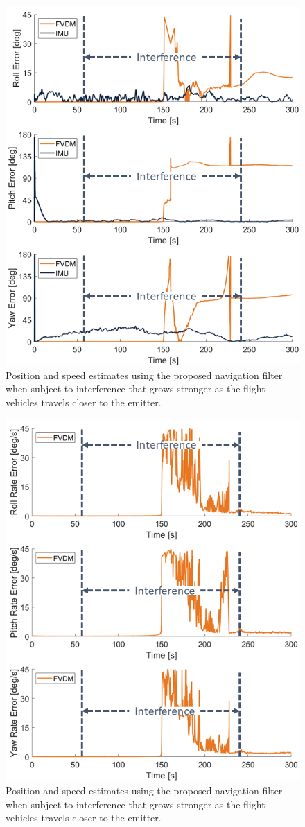\begin{figure}[!ht]
    \centering
    \includegraphics[width=0.75\linewidth]{Figures/Results/trajectoryfigure/Slide7.PNG}
    \caption{Position and speed estimates using the proposed navigation filter when subject to interference that grows stronger as the flight vehicles travels closer to the emitter.}\label{fig:EulScene2}
\end{figure}


\begin{figure}[!ht]
    \centering
    \includegraphics[width=0.75\linewidth]{Figures/Results/trajectoryfigure/Slide13.PNG}
    \caption{Position and speed estimates using the proposed navigation filter when subject to interference that grows stronger as the flight vehicles travels closer to the emitter.}\label{fig:AngScene2}
\end{figure}


